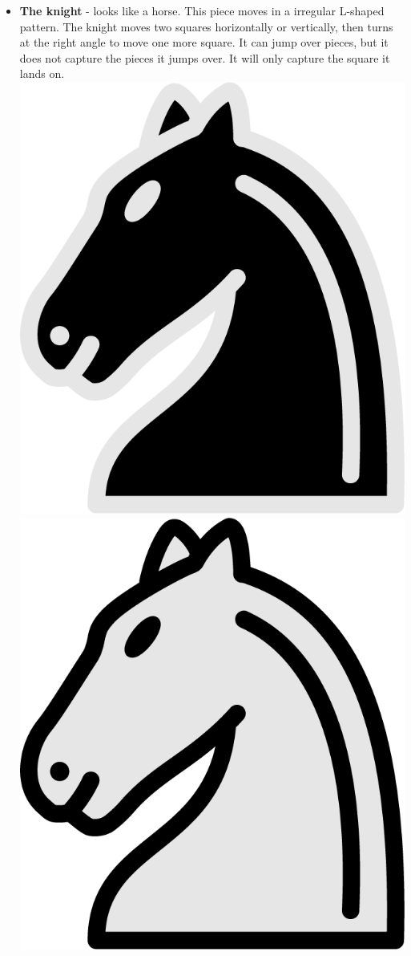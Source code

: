 \documentclass{article}
\begin{document}
\begin{itemize}
    \item \textbf{The knight} - looks like a horse. This piece moves in a irregular L-shaped pattern. The knight moves two squares horizontally or vertically, then turns at the right angle to move one more square. It can jump over pieces, but it does not capture the pieces it jumps over. It will only capture the square it lands on. \\
    \includegraphics[scale=0.1]{image13.png}
    \includegraphics[scale=0.1]{image10.png}
    

\end{itemize}
\end{document}
